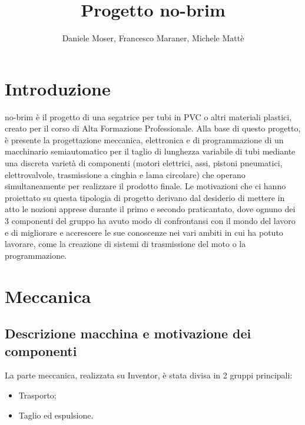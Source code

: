 \documentclass{report}
\title{Progetto no-brim}
\author{Daniele Moser, Francesco Maraner, Michele Mattè}
\begin{document}
\maketitle
\tableofcontents

\chapter{Introduzione}
no-brim è il progetto di una segatrice per tubi in PVC o altri materiali plastici, creato per il corso di Alta Formazione Professionale. Alla base di questo progetto, è presente la progettazione meccanica, elettronica e di programmazione di un macchinario semiautomatico per il taglio di lunghezza variabile di tubi mediante una discreta varietà di componenti (motori elettrici, assi, pistoni pneumatici, elettrovalvole, trasmissione a cinghia e lama circolare) che operano simultaneamente per realizzare il prodotto finale. Le motivazioni che ci hanno proiettato su questa tipologia di progetto derivano dal desiderio di mettere in atto le nozioni apprese durante il primo e secondo praticantato, dove ognuno dei 3 componenti del gruppo ha avuto modo di confrontansi con il mondo del lavoro e di migliorare e accrescere le sue conoscenze nei vari ambiti in cui ha potuto lavorare, come la creazione di sistemi di trasmissione del moto o la programmazione.
\chapter{Meccanica}

\section{Descrizione macchina e motivazione dei componenti}
La parte meccanica, realizzata su Inventor, è stata divisa in 2 gruppi principali:
\begin{itemize}
\item Trasporto;
\item Taglio ed espulsione.
\end{itemize}
\end{document}
